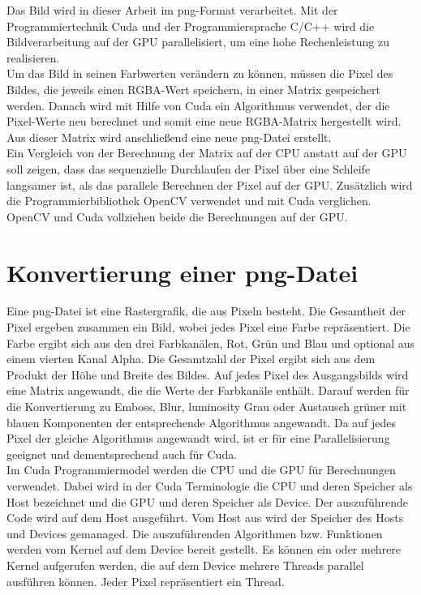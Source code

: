 \documentclass{llncs}
\begin{document}
Das Bild wird in dieser Arbeit im png-Format verarbeitet. Mit der Programmiertechnik Cuda und der Programmiersprache C/C++ wird die Bildverarbeitung auf der GPU parallelisiert, um eine hohe Rechenleistung zu realisieren.\\

Um das Bild in seinen Farbwerten verändern zu können, müssen die Pixel des Bildes, die jeweils einen RGBA-Wert speichern, in einer Matrix gespeichert werden. Danach wird mit Hilfe von Cuda ein Algorithmus verwendet, der die Pixel-Werte neu berechnet und somit eine neue RGBA-Matrix hergestellt wird. Aus dieser Matrix wird anschließend eine neue png-Datei erstellt.\\

Ein Vergleich von der Berechnung der Matrix auf der CPU anstatt auf der GPU soll zeigen, dass das sequenzielle Durchlaufen der Pixel über eine Schleife langsamer ist, als das parallele Berechnen der Pixel auf der GPU. Zusätzlich wird die Programmierbibliothek OpenCV verwendet und mit Cuda verglichen. OpenCV und Cuda vollziehen beide die Berechnungen auf der GPU.\\ 

%
\section{Konvertierung einer png-Datei}
%

Eine png-Datei ist eine Rastergrafik, die aus Pixeln besteht. Die Gesamtheit der Pixel ergeben zusammen ein Bild, wobei jedes Pixel eine Farbe repräsentiert. Die Farbe ergibt sich aus den drei Farbkanälen, Rot, Grün und Blau und optional aus einem vierten Kanal Alpha. Die Gesamtzahl der Pixel ergibt sich aus dem Produkt der Höhe und Breite des Bildes. Auf jedes Pixel des Ausgangsbilds wird eine Matrix angewandt, die die Werte der Farbkanäle enthält. Darauf werden für die Konvertierung zu Emboss, Blur, luminosity Grau oder Austausch grüner mit blauen Komponenten der entsprechende Algorithmus angewandt. Da auf jedes Pixel der gleiche Algorithmus angewandt wird, ist er für eine Parallelisierung geeignet und dementsprechend auch für Cuda.\\

Im Cuda Programmiermodel werden die CPU und die GPU für Berechnungen verwendet. Dabei wird in der Cuda Terminologie die CPU und deren Speicher als Host bezeichnet und die GPU und deren Speicher als Device. Der auszuführende Code wird auf dem Host ausgeführt. Vom Host aus wird der Speicher des Hosts und Devices gemanaged. Die auszuführenden Algorithmen bzw. Funktionen werden vom Kernel auf dem Device bereit gestellt. Es können ein oder mehrere Kernel aufgerufen werden, die auf dem Device mehrere Threads parallel ausführen können. Jeder Pixel repräsentiert ein Thread.\\
\end{document}
